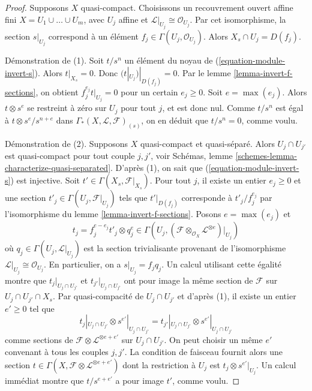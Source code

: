 \begin{proof}
Supposons $X$ quasi-compact. Choisissons un recouvrement ouvert affine fini
$X = U_1 \cup \ldots \cup U_m$, avec $U_j$ affine et
$\mathcal{L}|_{U_j} \cong \mathcal{O}_{U_j}$. Par cet isomorphisme,
la section $s|_{U_j}$ correspond à un élément
$f_j \in \Gamma(U_j, \mathcal{O}_{U_j})$. Alors
$X_s \cap U_j = D(f_j)$.

\medskip\noindent
Démonstration de (1). Soit $t/s^n$ un élément du noyau de
(\ref{equation-module-invert-s}). Alors $t|_{X_s} = 0$.
Donc $(t|_{U_j})|_{D(f_j)} = 0$. Par le
lemme \ref{lemma-invert-f-sections}, on obtient
$f_j^{e_j} t|_{U_j} = 0$ pour un certain
$e_j \geq 0$. Soit $e = \max(e_j)$. Alors $t \otimes s^e$
se restreint à zéro sur $U_j$ pour tout $j$, et est donc nul. Comme $t/s^n$
est égal à $t \otimes s^e/s^{n + e}$ dans
$\Gamma_*(X, \mathcal{L}, \mathcal{F})_{(s)}$, on en déduit que $t/s^n = 0$,
comme voulu.

\medskip\noindent
Démonstration de (2). Supposons $X$ quasi-compact et quasi-séparé.
Alors $U_j \cap U_{j'}$ est quasi-compact pour tout couple $j, j'$, voir
Schémas, lemme \ref{schemes-lemma-characterize-quasi-separated}.
D'après (1), on sait que (\ref{equation-module-invert-s}) est injective.
Soit $t' \in \Gamma(X_s, \mathcal{F}|_{X_s})$. Pour tout $j$, il existe un
entier $e_j \geq 0$ et une section $t'_j \in \Gamma(U_j, \mathcal{F}|_{U_j})$ tels que
$t'|_{D(f_j)}$ corresponde à $t'_j/f_j^{e_j}$
par l'isomorphisme du lemme \ref{lemma-invert-f-sections}.
Posons $e = \max(e_j)$ et
$$
t_j = f_j^{e - e_j} t'_j \otimes q_j^e \in
\Gamma(U_j,
(\mathcal{F} \otimes_{\mathcal{O}_X} \mathcal{L}^{\otimes e})|_{U_j})
$$
où $q_j \in \Gamma(U_j, \mathcal{L}|_{U_j})$ est la section trivialisante
provenant de l'isomorphisme
$\mathcal{L}|_{U_j} \cong \mathcal{O}_{U_j}$. En particulier, on a
$s|_{U_j} = f_j q_j$. Un calcul utilisant cette égalité montre que
$t_j|_{U_j \cap U_{j'}}$ et $t_{j'}|_{U_j \cap U_{j'}}$
ont pour image la même section de $\mathcal{F}$ sur $U_j \cap U_{j'} \cap X_s$.
Par quasi-compacité de $U_j \cap U_{j'}$ et d'après (1), il existe un
entier $e' \geq 0$ tel que
$$
t_j|_{U_j \cap U_{j'}} \otimes s^{e'}|_{U_j \cap U_{j'}} =
t_{j'}|_{U_j \cap U_{j'}} \otimes s^{e'}|_{U_j \cap U_{j'}}
$$
comme sections de $\mathcal{F} \otimes \mathcal{L}^{\otimes e + e'}$ sur
$U_j \cap U_{j'}$. On peut choisir un même $e'$ convenant à tous les couples
$j, j'$. La condition de faisceau fournit alors une section
$t \in \Gamma(X, \mathcal{F} \otimes \mathcal{L}^{\otimes e + e'})$
dont la restriction à $U_j$ est $t_j \otimes s^{e'}|_{U_j}$.
Un calcul immédiat montre que $t/s^{e + e'}$ a pour image $t'$,
comme voulu.
\end{proof}


